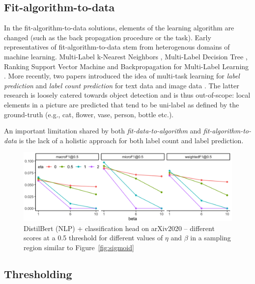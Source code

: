 \subsection{Fit-algorithm-to-data}
In the fit-algorithm-to-data solutions, elements of the learning
algorithm are changed (such as the back propagation procedure or the task).
Early representatives of fit-algorithm-to-data stem from heterogenous domains
of machine learning. Multi-Label k-Nearest Neighbors \cite{ML-KNN},
Multi-Label Decision Tree \cite{ML-DT}, Ranking Support Vector Machine
\cite{multilabelSVM} and Backpropagation for Multi-Label Learning
\cite{multilabelBackprop}. More recently, two papers introduced the idea of
multi-task learning for \emph{label prediction} and \emph{label count
prediction} for text data \cite[ML\(_{\text{NET}}\)][]{multitaskLabel} and image
data \cite{multitaskLabelImages, tencent}. The latter research is loosely
catered towards object detection and is thus out-of-scope: local elements in a picture are predicted that tend to be uni-label as defined by the ground-truth (e.g., cat, flower, vase, person, bottle
etc.).

An important limitation shared by both \emph{fit-data-to-algorithm} and \emph{fit-algorithm-to-data} is the lack of a holistic approach for both label count and label prediction.

\begin{figure}[t!]
\centering
\includegraphics[width=.8\linewidth]{./images/betaEtaResized.png}
\vspace{.5\baselineskip}
\caption{\label{fig:betaEta}
DistilBert (NLP) + classification head on arXiv2020 – different scores at a 0.5 threshold for different values of $\eta$ and $\beta$ in a sampling region similar to Figure~\ref{fig:sigmoid}}
\end{figure}

\subsection{Thresholding}
\label{subsec:thresh}

